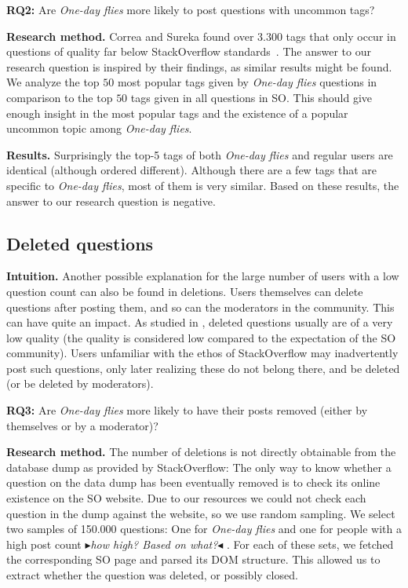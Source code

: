 \documentclass[conference]{IEEEtran}
\newcommand{\nb}[3]{
  \fcolorbox{black}{#2}{\bfseries\sffamily\scriptsize#1}
    {\sf\small$\blacktriangleright$\textit{#3}$\blacktriangleleft$}
}
\newcommand\AB[1]{\nb{alberto}{cyan}{#1}}
\newcommand\odf{\emph{One-day flies}\xspace}
\begin{document}
\textbf{RQ2:} Are \odf more likely to post questions with uncommon tags?
 
\textbf{Research method.} Correa and Sureka found over $3.300$ tags that only
occur in questions of quality far below StackOverflow
standards~\cite{correa2014chaff}. The answer to our research question is
inspired by their findings, as similar results might be found. We analyze the
top $50$ most popular tags given by \odf questions in comparison to the top
$50$ tags given in all questions in SO. This should give enough insight in the
most popular tags and the existence of a popular uncommon topic among \odf.

\textbf{Results.} Surprisingly the top-5 tags of both \odf and regular users
are identical (although ordered different). Although there are a few tags that
are specific to \odf, most of them is very similar. Based on these results, the
answer to our research question is negative. 

\subsection{Deleted questions}

\textbf{Intuition.} Another possible explanation for the large number of users
with a low question count can also be found in deletions. Users themselves can
delete questions after posting them, and so can the moderators in the
community. This can have quite an impact. As studied in \cite{correa2014chaff},
deleted questions usually are of a very low quality (the quality is considered
low compared to the expectation of the SO community). Users unfamiliar with the
ethos of StackOverflow may inadvertently post such questions, only later
realizing these do not belong there, and be deleted (or be deleted by
moderators). 
 
\textbf{RQ3:} Are \odf more likely to have their posts removed (either by
themselves or by a moderator)?
 
\textbf{Research method.} The number of deletions is not directly obtainable
from the database dump as provided by StackOverflow: The only way to know
whether a question on the data dump has been eventually removed is to check its
online existence on the SO website. Due to our resources we could not check
each question in the dump against the website, so we use random sampling. We
select two samples of 150.000 questions: One for \odf and one for people with a
high post count \AB{how high? Based on what?}. For each of these sets, we
fetched the corresponding SO page and parsed its DOM structure. This allowed us
to extract whether the question was deleted, or possibly closed.
\end{document}
